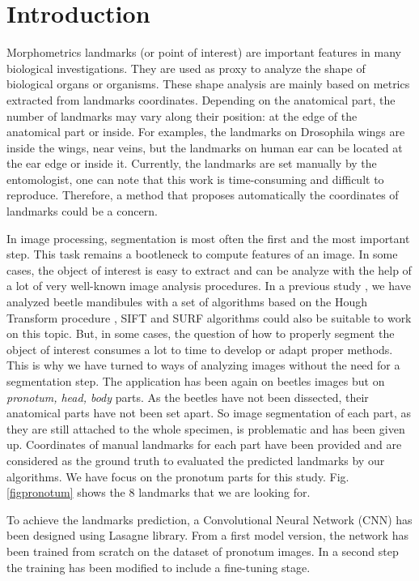 \documentclass[10pt]{article}
\begin{document}
\section{Introduction}
Morphometrics landmarks (or point of interest) are important features
in many biological investigations. They are used as proxy to analyze
the shape of biological organs or organisms. These shape analysis are mainly
based on metrics extracted from landmarks coordinates. Depending on the anatomical part, the number of landmarks may vary along their position: at the edge of the anatomical part or inside. For
  examples, the landmarks on Drosophila wings \cite{drosophilaWings} are inside the wings, near veins, but the landmarks on human ear \cite{cintas2016automatic} can be located at
the ear edge or inside it. Currently, the landmarks are set manually by
the entomologist, one can note that this work is time-consuming and difficult to
reproduce. Therefore, a method that proposes automatically the
coordinates of landmarks could be a concern.

In image processing, segmentation is most often the first and the most
important step. This task remains a bootleneck to compute features of
an image. In some cases, the object of interest is easy to extract and
can be analyze with the help of a lot of very well-known image
analysis procedures. In a previous study \cite{le2017maelab}, we have analyzed beetle
mandibules with a set of algorithms based on the Hough Transform
procedure \cite{palaniswamy2010automatic}, SIFT
\cite{lowe2004distinctive} and SURF \cite{bay2006surf} algorithms could also be
suitable to work on this topic. But, in some cases, the question of how to properly segment the
object of interest consumes a lot to time to develop or adapt proper methods. This is why
we have turned to ways of analyzing images without the need for a segmentation step. The application has been again on beetles images
but on \textit{pronotum, head, body} parts. As the beetles have not been dissected, their anatomical parts have not been set apart. So image segmentation of each part, as they are still attached to the whole specimen, is problematic and has been given up. Coordinates of manual landmarks for each part
have been provided and are considered as the ground
truth to evaluated the predicted landmarks by our algorithms. We have focus on the
pronotum parts for this study. Fig.\ref{figpronotum} shows
the $8$ landmarks that we are looking for.


To achieve the landmarks prediction, a Convolutional Neural Network
(CNN)\cite{lecun2010convolutional} has been designed using Lasagne
library\cite{lasagne}. From a first model version, the network has been
trained from scratch on the dataset of pronotum images. In a second
step the training has been modified to include a fine-tuning
\cite{yosinski2014transferable} stage.
\end{document}
